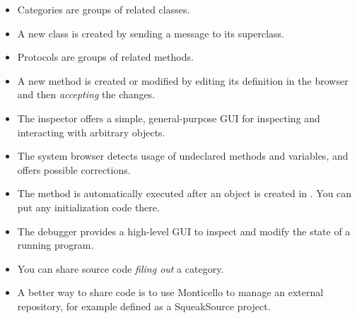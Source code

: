 \documentclass[a4paper,10pt,twoside]{book}
\begin{document}
\begin{itemize}
  \item Categories are groups of related classes.
  \item A new class is created by sending a message to its superclass.
  \item Protocols are groups of related methods.
  \item A new method is created or modified by editing its definition in the browser and then \emph{accepting} the changes.
  \item The inspector offers a simple, general-purpose GUI for inspecting and interacting with arbitrary objects.
  \item The system browser detects usage of undeclared methods and variables, and offers possible corrections.
  \item The  method is automatically executed after an object is created in \squeak. You can put any initialization code there.
  \item The debugger provides a high-level GUI to inspect and modify the state of a running program.
  \item You can share source code \emph{filing out} a category.
  \item A better way to share code is to use Monticello to manage an external repository, for example defined as a SqueakSource project.
\end{itemize}

\ifx\wholebook\relax\else
\end{document}
